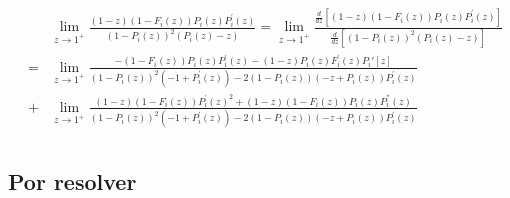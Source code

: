 \documentclass{article}
\begin{document}
\begin{eqnarray*}
&&\lim_{z\rightarrow1^{+}}\frac{\left(1-z\right)\left(1-F_{i}\left(z\right)\right)P_{i}\left(z\right)P_{i}^{'}\left(z\right)}{\left(1-P_{i}\left(z\right)\right)^{2}\left(P_{i}\left(z\right)-z\right)}=\lim_{z\rightarrow1^{+}}\frac{\frac{d}{dz}\left[\left(1-z\right)\left(1-F_{i}\left(z\right)\right)P_{i}\left(z\right)P_{i}^{'}\left(z\right)\right]}{\frac{d}{dz}\left[\left(1-P_{i}\left(z\right)\right)^{2}\left(P_{i}\left(z\right)-z\right)\right]}\\
&=&\lim_{z\rightarrow1^{+}}\frac{-\left(1-F_{i}\left(z\right)\right) P_{i}\left(z\right) P_{i}^{'}\left(z\right)-(1-z) P_{i}\left(z\right) F_{i}^{'}\left(z\right)P_i'[z]}{\left(1-P_{i}\left(z\right)\right)^2 \left(-1+P_{i}^{'}\left(z\right)\right)-2 \left(1-P_{i}\left(z\right)\right) \left(-z+P_{i}\left(z\right)\right) P_{i}^{'}\left(z\right)}\\
&+&\lim_{z\rightarrow1^{+}}\frac{(1-z) \left(1-F_{i}\left(z\right)\right) P_{i}^{'}\left(z\right)^2+(1-z) \left(1-F_{i}\left(z\right)\right) P_{i}\left(z\right) P_{i}^{''}\left(z\right)}{\left(1-P_{i}\left(z\right)\right)^2 \left(-1+P_{i}^{'}\left(z\right)\right)-2 \left(1-P_{i}\left(z\right)\right) \left(-z+P_{i}\left(z\right)\right) P_{i}^{'}\left(z\right)}\\
\end{eqnarray*}

\subsection{Por resolver}
\end{document}
